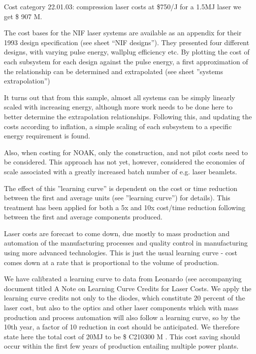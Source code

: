 Cost category 22.01.03: compression laser costs at  \$750/J for a 1.5MJ laser we get \$ 907 M.


The cost bases for the NIF laser systems are available 
as an appendix for their 1993 design specification (see sheet ``NIF designs''). They presented four different designs, with varying pulse energy, wallplug efficiency etc. By plotting the cost of each subsystem for each design against the pulse energy, a first approximation of the relationship  can be determined and extrapolated (see sheet ''systems extrapolation'')

It turns out that from this sample, almost all systems can be simply linearly scaled with increasing energy, although more work  needs to be done here to better determine the extrapolation relationships.  Following this, and updating the costs according to inflation, a simple scaling of each subsystem to a specific energy requirement is found.

Also, when costing for NOAK, only the construction, and not pilot costs need to be considered. This approach has not yet, however, considered the economies of scale associated with a greatly increased batch 
number of e.g. laser beamlets.

The effect of this ''learning curve'' is dependent on the cost or time reduction between the first and average units (see ''learning curve'') for details). This treatment has been applied for both a 5x and 10x cost/time 
reduction following between the first and average components produced.

Laser costs are forecast to come down, due mostly to mass production and automation of the manufacturing processes and quality control in manufacturing using more advanced technologies. This is just the usual learning curve - cost comes down at a rate that is proportional to the volume of production. 

We have calibrated a learning curve to data from Leonardo (see accompanying document titled A Note on Learning Curve Credits for Laser Costs. We apply the learning curve credits not only to the diodes, which constitute 20 percent of the laser cost, but also to the optics and other laser components which with mass production and process automation will also follow a learning curve, so by the 10th year, a factor of 10 reduction in cost should be anticipated.  We therefore state here the total cost of 20MJ to be \$ C210300 M .  This cost saving should occur within the first few years of production entailing multiple power plants.

